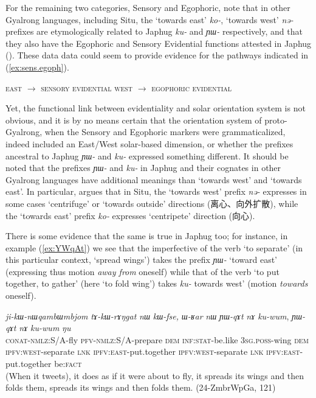 \documentclass[oneside,a4paper,11pt]{article}
\newcommand{\ipa}[1]{\mbox{\phon\textit{#1}}} %
\newcommand{\zh}[1]{{\cn #1}}
\begin{document}
For the remaining two categories, Sensory and Egophoric, note that in other Gyalrong languages, including Situ, the `towards east' \ipa{ko-}, `towards west' \ipa{nə-} prefixes are etymologically related to Japhug \ipa{ku-} and \ipa{ɲɯ-} respectively, and that they also have the Egophoric and Sensory Evidential functions attested in Japhug (\citealt{lin02dimension}). These data data could seem to provide evidence for the pathways indicated in (\ref{ex:sens.egoph}).


\begin{exe}
\ex \label{ex:sens.egoph}
\glt \textsc{east} $\rightarrow $ \textsc{sensory evidential} 
\glt \textsc{west} $\rightarrow $ \textsc{egophoric evidential}
\end{exe}

Yet, the functional link between evidentiality and solar orientation system is not obvious, and it is by no means certain that the orientation system of proto-Gyalrong, when the Sensory and Egophoric markers were grammaticalized, indeed included an East/West solar-based dimension, or whether the prefixes ancestral to Japhug \ipa{ɲɯ-} and \ipa{ku-} expressed something different.  It should be noted that the prefixes  \ipa{ɲɯ-} and \ipa{ku-} in Japhug and their cognates in other Gyalrong languages have additional meanings than `towards west' and `towards east'. In particular, \citet[228-9]{linxr93jiarong} argues that in Situ, the `towards west' prefix \ipa{nə-} expresses in some cases `centrifuge' or `towards outside' directions (\zh{离心、向外扩散}), while the `towards east' prefix \ipa{ko-} expresses `centripete' direction (\zh{向心}). 

There is some evidence that the same is true in Japhug too; for instance, in example (\ref{ex:YWqAt}) we see that the imperfective of the verb `to separate' (in this particular context, `spread wings') takes the prefix \ipa{ɲɯ-} `toward east' (expressing thus motion \textit{away from} oneself) while that of the verb `to put together, to gather' (here `to fold wing') takes \ipa{ku-}  towards west' (motion \textit{towards} oneself).

\begin{exe}
\ex \label{ex:YWqAt}
\gll \ipa{ji-kɯ-nɯqambɯmbjom} 	\ipa{tɤ-kɯ-rɤŋgat} 	\ipa{nɯ} 	\ipa{kɯ-fse,} 	\ipa{ɯ-ʁar} 	\ipa{nɯ} 	\ipa{ɲɯ-qɤt} 	\ipa{nɤ} 	\ipa{ku-wum}, 	\ipa{ɲɯ-qɤt} 	\ipa{nɤ} 	\ipa{ku-wum} \ipa{ŋu} \\
\textsc{conat-nmlz:S/A}-fly \textsc{pfv-nmlz:S/A}-prepare \textsc{dem} \textsc{inf:stat}-be.like \textsc{3sg.poss}-wing \textsc{dem}  \textsc{ipfv:west}-separate \textsc{lnk} \textsc{ipfv:east}-put.together \textsc{ipfv:west}-separate \textsc{lnk} \textsc{ipfv:east}-put.together be:\textsc{fact} \\
\glt (When it tweets), it does as if it were about to fly, it spreads its wings and then folds them, spreads its wings and then folds them. (24-ZmbrWpGa, 121)
\end{exe}
\end{document}

